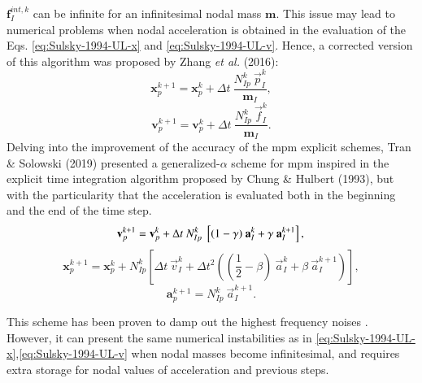 \documentclass[preprint,12pt,a4paper]{elsarticle}
\newcommand{\vect}[1]{
  \ensuremath{\mathbf{{#1}}}
}
\newcommand{\tens}[1]{
  \ensuremath{\mathbf{{#1}}}
}
\begin{document}
$\vect{f}_I^{int,k}$ can be infinite for an infinitesimal nodal mass
$\tens{m}$. This issue may lead to numerical problems when nodal acceleration
is obtained in the evaluation of the Eqs. \eqref{eq:Sulsky-1994-UL-x} and \eqref{eq:Sulsky-1994-UL-v}. Hence, a
corrected version of this algorithm was proposed by Zhang {\it et al.}
(2016)\cite{Zhang_book_2016}:
\begin{equation}
  \label{eq:Zhang-2016-UL-x}
  \vect{x}_p^{k+1} = \vect{x}_p^{k} + \Delta t\ \frac{N_{Ip}^{k}\ \vec{p}_{I}^{k}}{\tens{m}_I}, 
\end{equation}
\begin{equation}
  \label{eq:Zhang-2016-UL-v}
  \vect{v}_p^{k+1} = \vect{v}_p^{k} + \Delta t\ \frac{N_{Ip}^{k}\ \vec{f}_{I}^{k}}{\tens{m}_I}.
\end{equation}
Delving into the improvement of the accuracy of the \acrshort{mpm} explicit schemes, Tran \& Solowski (2019)\cite{Tran2019e} presented a
generalized-$\alpha$ scheme for \acrshort{mpm} inspired in the explicit time
integration algorithm proposed by Chung \& Hulbert
(1993)\cite{Geranlized_alpha_1993}, but with the particularity that
the acceleration is evaluated both in the beginning and the end of the
time step.
\begin{equation}
  \label{eq:Tran-2019-GA-v}
  \vect{v}_p^{k+1} = \vect{v}_p^{k} + \Delta t\  N_{Ip}^{k}\ \left[(1 - \gamma)\ \vect{a}_I^{k} +
    \gamma\ \vect{a}_I^{k+1} \right],\\
\end{equation}
\begin{equation}
\label{eq:Tran-2019-GA-x}
  \vect{x}_p^{k+1} = \vect{x}_p^{k} + N_{Ip}^{k} \left[ \Delta t\ \vec{v}_{I}^{k}+ \Delta t^2\left( (\frac{1}{2} - \beta)\
    \vec{a}_{I}^{k} + \beta\ \vec{a}_{I}^{k+1} \right) \right],
\end{equation}
\begin{equation}
  \label{eq:Tran-2019-GA-a}
  \vect{a}_p^{k+1} = N_{Ip}^{k}\ \vec{a}_{I}^{k+1}.
\end{equation}

This scheme has been proven to damp out the highest frequency noises
\cite{Tran2019e}. However, it can present the same numerical instabilities
as in \eqref{eq:Sulsky-1994-UL-x},\eqref{eq:Sulsky-1994-UL-v} when
nodal masses become infinitesimal, and requires extra storage for
nodal values of acceleration and previous steps.
\end{document}
